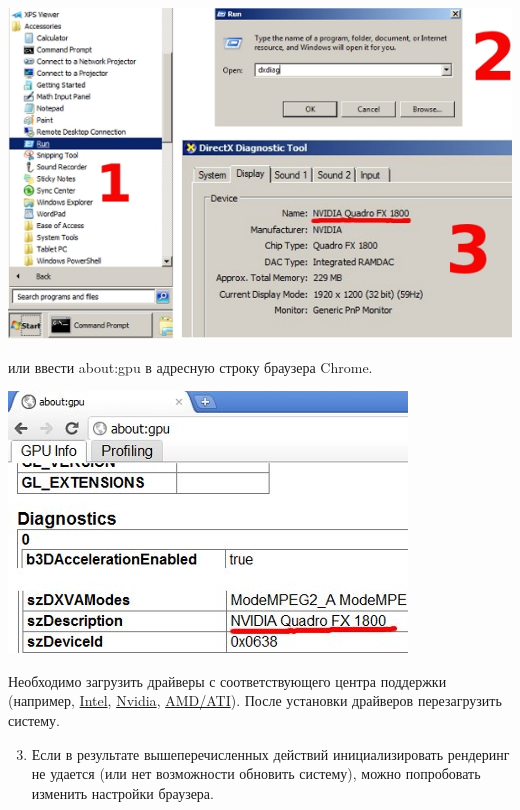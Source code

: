 \documentclass[a4paper,12pt,oneside]{sphinxmanual}
\begin{document}
{\hfill\includegraphics[width=1.000\linewidth]{dxdiag.jpg}\hfill}

или ввести about:gpu в адресную строку браузера Chrome.

{\hfill\includegraphics[width=1.000\linewidth]{about_gpu_directx.jpg}\hfill}

Необходимо загрузить драйверы с соответствующего центра поддержки (например, \href{http://downloadcenter.intel.com/Default.aspx?lang=rus}{Intel}, \href{http://www.nvidia.com/Download/index.aspx?lang=ru}{Nvidia}, \href{http://support.amd.com/us/gpudownload/Pages/index.aspx}{AMD/ATI}). После установки драйверов перезагрузить систему.
\begin{enumerate}
\setcounter{enumi}{2}
\item {} 
Если в результате вышеперечисленных действий инициализировать рендеринг не удается (или нет возможности обновить систему), можно попробовать изменить настройки браузера.

\end{enumerate}
\end{document}
